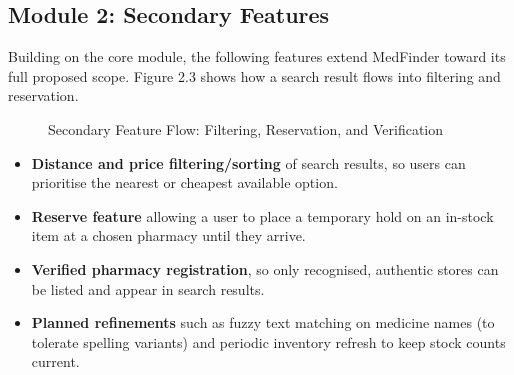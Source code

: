\documentclass[11pt,a4paper]{report}
\begin{document}
\subsection{Module 2: Secondary Features}

Building on the core module, the following features extend MedFinder toward its full proposed scope. Figure 2.3 shows how a search result flows into filtering and reservation.

\begin{figure}[h!]
\centering
{}
\caption{Secondary Feature Flow: Filtering, Reservation, and Verification}
\end{figure}

\begin{itemize}
    \item \textbf{Distance and price filtering/sorting} of search results, so users can prioritise the nearest or cheapest available option.
    \item \textbf{Reserve feature} allowing a user to place a temporary hold on an in-stock item at a chosen pharmacy until they arrive.
    \item \textbf{Verified pharmacy registration}, so only recognised, authentic stores can be listed and appear in search results.
    \item \textbf{Planned refinements} such as fuzzy text matching on medicine names (to tolerate spelling variants) and periodic inventory refresh to keep stock counts current.
\end{itemize}

\end{document}
